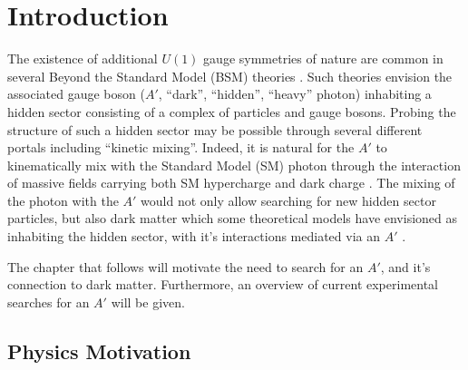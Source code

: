 \chapter{Introduction}

The existence of additional $U(1)$ gauge symmetries of nature are common in
several Beyond the Standard Model (BSM) theories \cite{goodsell2010, 
candelas1985, andreas2013, jaeckel2010}. Such theories envision the associated
gauge boson ($A'$, ``dark'', ``hidden'', ``heavy'' photon) inhabiting a hidden sector
consisting of a complex of particles and gauge bosons.  Probing the 
structure of such a hidden sector may be possible through several different portals
including ``kinetic mixing''.  Indeed, it is natural for the $A'$ to 
kinematically mix with the Standard Model (SM) photon through the interaction
of massive fields carrying both SM hypercharge and dark charge \cite{holdom1986}.
The mixing of the photon with the $A'$ would not only allow searching for
new hidden sector particles, but also dark matter which some theoretical models
have envisioned as inhabiting the hidden sector, with it's interactions mediated
via an $A'$ \cite{Arkani-Hamed2009, pospelov2009, cheung2009, arkani-hamed2008}.

The chapter that follows will motivate the need to search for an $A'$, and it's
connection to dark matter.  Furthermore, an overview of current experimental 
searches for an $A'$ will be given.


\section{Physics Motivation}

